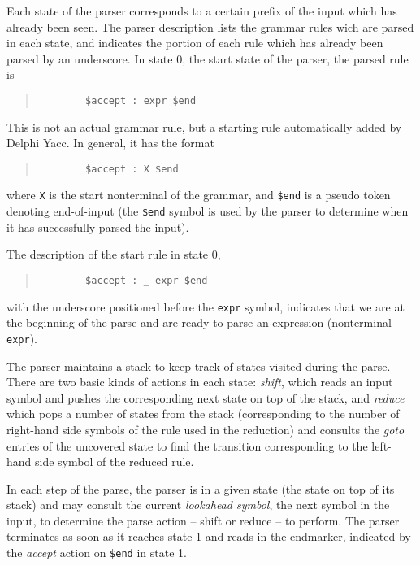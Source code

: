 \documentclass{article}
\begin{document}
Each state of the parser corresponds to a certain prefix of the input
which has already been seen. The parser description lists the grammar
rules wich are parsed in each state, and indicates the portion of each
rule which has already been parsed by an underscore. In state 0, the
start state of the parser, the parsed rule is
\begin{quote}\begin{verbatim}
        $accept : expr $end
\end{verbatim}\end{quote}

This is not an actual grammar rule, but a starting rule automatically
added by Delphi Yacc. In general, it has the format
\begin{quote}\begin{verbatim}
        $accept : X $end
\end{verbatim}\end{quote}
where \verb"X" is the start nonterminal of the grammar, and \verb"$end" is
a pseudo token denoting end-of-input (the \verb"$end" symbol is used by the
parser to determine when it has successfully parsed the input).

The description of the start rule in state 0,
\begin{quote}\begin{verbatim}
        $accept : _ expr $end
\end{verbatim}\end{quote}
with the underscore positioned before the \verb"expr" symbol, indicates that
we are at the beginning of the parse and are ready to parse an expression
(nonterminal \verb"expr").

The parser maintains a stack to keep track of states visited during the
parse. There are two basic kinds of actions in each state: {\em shift\/},
which reads an input symbol and pushes the corresponding next state on top of
the stack, and {\em reduce\/} which pops a number of states from the stack
(corresponding to the number of right-hand side symbols of the rule used
in the reduction) and consults the {\em goto\/} entries of the uncovered
state to find the transition corresponding to the left-hand side symbol of the
reduced rule.

In each step of the parse, the parser is in a given state (the state on
top of its stack) and may consult the current {\em lookahead symbol\/}, the
next symbol in the input, to determine the parse action -- shift or reduce --
to perform. The parser terminates as soon as it reaches state 1 and reads
in the endmarker, indicated by the {\em accept\/} action on \verb"$end" in
state 1.
\end{document}
